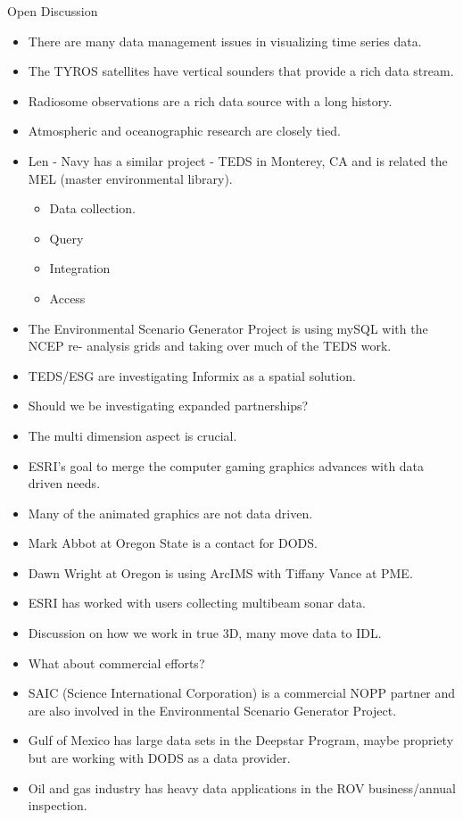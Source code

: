         Open Discussion

\begin{itemize}
\item There are many data management issues in visualizing time series data.
\item The TYROS satellites have vertical sounders that provide a rich data stream.
\item Radiosome observations are a rich data source with a long history.
\item Atmospheric and oceanographic research are closely tied.
\item Len - Navy has a similar project - TEDS in Monterey, CA and is related the MEL (master 
environmental library).
\begin{itemize}
\item Data collection.
\item Query
\item Integration
\item Access
\end{itemize}
\item The Environmental Scenario Generator Project is using mySQL with the NCEP re-
analysis grids and taking over much of the TEDS work.
\item TEDS/ESG are investigating Informix as a spatial solution.
\item Should we be investigating expanded partnerships?
\item The multi dimension aspect is crucial.
\item ESRI's goal to merge the computer gaming graphics advances with data driven needs.
\item Many of the animated graphics are not data driven.
\item Mark Abbot at Oregon State is a contact for DODS.
\item Dawn Wright at Oregon is using ArcIMS with Tiffany Vance at PME.
\item ESRI has worked with users collecting multibeam sonar data.
\item Discussion on how we work in true 3D, many move data to IDL.
\item What about commercial efforts?
\item SAIC (Science International Corporation) is a commercial NOPP partner and are also 
involved in the Environmental Scenario Generator Project.
\item Gulf of Mexico has large data sets in the Deepstar Program, maybe propriety but are 
working with DODS as a data provider.
\item Oil and gas industry has heavy data applications in the ROV business/annual inspection.
\end{itemize}


